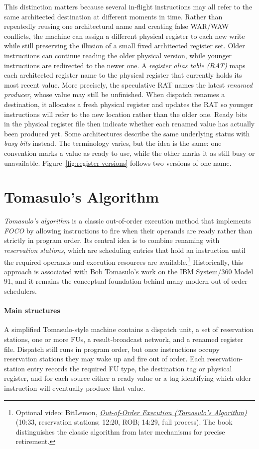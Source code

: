 This distinction matters because several in-flight instructions may all refer to the same architected destination at different moments in time.
Rather than repeatedly reusing one architectural name and creating false WAR/WAW conflicts, the machine can assign a different physical register to each new write while still preserving the illusion of a small fixed architected register set.
Older instructions can continue reading the older physical version, while younger instructions are redirected to the newer one.
A \textit{register alias table (RAT)} maps each architected register name to the physical register that currently holds its most recent value.
More precisely, the speculative RAT names the latest \emph{renamed producer}, whose value may still be unfinished.
When dispatch renames a destination, it allocates a fresh physical register and updates the RAT so younger instructions will refer to the new location rather than the older one.
Ready bits in the physical register file then indicate whether each renamed value has actually been produced yet.
Some architectures describe the same underlying status with \textit{busy bits} instead.
The terminology varies, but the idea is the same: one convention marks a value as ready to use, while the other marks it as still busy or unavailable.
Figure~\ref{fig:register-versions} follows two versions of one name.



\section{Tomasulo's Algorithm}\label{sec:ilp-tomasulo}
\textit{Tomasulo's algorithm} is a classic out-of-order execution method that implements \textit{FOCO} by allowing instructions to fire when their operands are ready rather than strictly in program order.
Its central idea is to combine renaming with \textit{reservation stations}, which are scheduling entries that hold an instruction until the required operands and execution resources are available.\footnote{Optional video: BitLemon, \href{https://youtu.be/EzEKGlO9w4Y?t=633}{\emph{Out-of-Order Execution (Tomasulo's Algorithm)}} (10:33, reservation stations; 12:20, ROB; 14:29, full process). The book distinguishes the classic algorithm from later mechanisms for precise retirement.}
Historically, this approach is associated with Bob Tomasulo's work on the IBM System/360 Model 91, and it remains the conceptual foundation behind many modern out-of-order schedulers.

\paragraph{Main structures}\label{par:ilp-tomasulo-structures}
A simplified Tomasulo-style machine contains a dispatch unit, a set of reservation stations, one or more FUs, a result-broadcast network, and a renamed register file.
Dispatch still runs in program order, but once instructions occupy reservation stations they may wake up and fire out of order.
Each reservation-station entry records the required FU type, the destination tag or physical register, and for each source either a ready value or a tag identifying which older instruction will eventually produce that value.

